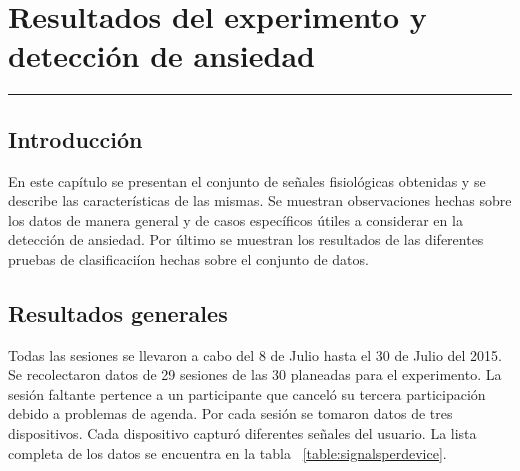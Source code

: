 
\chapter{Resultados del experimento y detecci\'on de ansiedad}\label{capit:cap4}
\vspace{-2.0325ex}%
\noindent
\rule{\textwidth}{0.5pt}
\vspace{-5.5ex}%
\newcommand{\pushline}{\Indp}%

\section{Introducci\'on}\label{cap4:intro}
En este cap\'itulo se presentan el conjunto de se\~nales fisiol\'ogicas obtenidas y se describe las caracter\'isticas de las mismas. Se muestran observaciones hechas sobre los datos de manera general y de casos espec\'ificos \'utiles a considerar en la detecci\'on de ansiedad. Por \'ultimo se muestran los resultados de las diferentes pruebas de clasificaci\'ion hechas sobre el conjunto de datos.

\section{Resultados generales}
Todas las sesiones se llevaron a cabo del 8 de Julio hasta el 30 de Julio del 2015. Se recolectaron datos de 29 sesiones de las 30 planeadas para el experimento. La sesi\'on faltante pertence a un participante que cancel\'o su tercera participaci\'on debido a problemas de agenda. Por cada sesi\'on se tomaron datos de tres dispositivos. Cada dispositivo captur\'o diferentes se\~nales del usuario. La lista completa de los datos se encuentra en la tabla ~\ref{table:signalsperdevice}.

